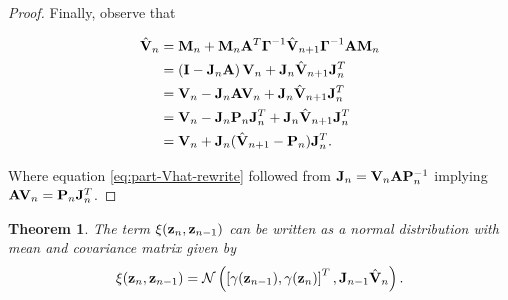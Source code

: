 \documentclass[11pt]{article}
\numberwithin{equation}{section}
\newcommand{\z}{{\bf z}}
\newcommand{\N}{\mathcal{N}}
\newtheorem{theorem}{Theorem}[section]
\begin{document}
\begin{proof}
	Finally, observe that 
	
	\begin{align}
		\hat{{\bf V}}_n
		&= {\bf M}_n + {\bf M}_n {\bf A}^T \boldsymbol{\Gamma}^{-1} \hat{\bf V}_{n+1}\boldsymbol\Gamma^{-1}{\bf A}{\bf M}_n\\
		&= \left({\bf I} - {\bf J}_n{\bf A}\right){\bf V}_n + {\bf J}_n\hat{\bf V}_{n+1}{\bf J}_n^T\\
		&= {\bf V}_n - {\bf J}_n{\bf A}{\bf V}_n + {\bf J}_n\hat{\bf V}_{n+1}{\bf J}_n^T\\
		&= {\bf V}_n - {\bf J}_n{\bf P}_n{\bf J}_n^T + {\bf J}_n\hat{\bf V}_{n+1}{\bf J}_n^T \label{eq:part-Vhat-rewrite} \\
		&= {\bf V}_n + {\bf J}_n(\hat{\bf V}_{n+1} - {\bf P}_n){\bf J}_n^T.\\
	\end{align}
	
	Where equation \eqref{eq:part-Vhat-rewrite} followed from ${\bf J}_n = {\bf V}_n{\bf A}{\bf P}_n^{-1}$ implying ${\bf AV}_n = {\bf P}_n{\bf J}_n^T$.
\end{proof}

\begin{theorem}
	The term $\xi(\z_n, \z_{n-1})$ can be written as a normal distribution with mean and covariance matrix given by
	\begin{equation}
		\xi(\z_n, \z_{n-1}) = \N\left(\left[\gamma(\z_{n-1}), \gamma(\z_{n})\right]^T, {\bf J}_{n-1}\hat{\bf V}_{n}\right).
	\end{equation}
\end{theorem}
\end{document}
